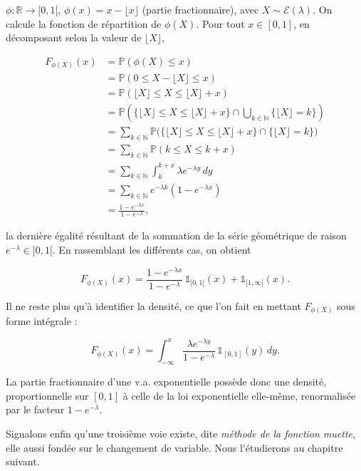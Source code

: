 \begin{exemple}
$\phi : \mathbb{R} \to [0, 1[$, $\phi(x) = x - \lfloor x \rfloor$ (partie fractionnaire), avec $X \sim \mathcal{E}(\lambda)$. On calcule la fonction de répartition de $\phi(X)$. Pour tout $x \in [0, 1]$, en décomposant selon la valeur de $\lfloor X \rfloor$,

\begin{align*}
F_{\phi(X)}(x) &= \mathbb{P}(\phi(X) \leq x) \\
&= \mathbb{P}(0 \leq X - \lfloor X \rfloor \leq x) \\
&= \mathbb{P}(\lfloor X \rfloor \leq X \leq \lfloor X \rfloor + x) \\
&= \mathbb{P}\left(\{\lfloor X \rfloor \leq X \leq \lfloor X \rfloor + x\} \cap \bigcup_{k \in \mathbb{N}} \{\lfloor X \rfloor = k\}\right) \\
&= \sum_{k \in \mathbb{N}} \mathbb{P}\big(\{\lfloor X \rfloor \leq X \leq \lfloor X \rfloor + x\} \cap \{\lfloor X \rfloor = k\}\big) \\
&= \sum_{k \in \mathbb{N}} \mathbb{P}(k \leq X \leq k + x) \\
&= \sum_{k \in \mathbb{N}} \int_k^{k+x} \lambda e^{-\lambda y}\, dy \\
&= \sum_{k \in \mathbb{N}} e^{-\lambda k}(1 - e^{-\lambda x}) \\
&= \frac{1 - e^{-\lambda x}}{1 - e^{-\lambda}},
\end{align*}

la dernière égalité résultant de la sommation de la série géométrique de raison $e^{-\lambda} \in {]0, 1[}$. En rassemblant les différents cas, on obtient

$$
F_{\phi(X)}(x) = \frac{1 - e^{-\lambda x}}{1 - e^{-\lambda}}\, \mathbb{1}_{[0,1[}(x) + \mathbb{1}_{[1,\infty[}(x).
$$

Il ne reste plus qu'à identifier la densité, ce que l'on fait en mettant $F_{\phi(X)}$ sous forme intégrale :

$$
F_{\phi(X)}(x) = \int_{-\infty}^x \frac{\lambda e^{-\lambda y}}{1 - e^{-\lambda}}\, \mathbb{1}_{[0,1]}(y)\, dy.
$$

La partie fractionnaire d'une v.a. exponentielle possède donc une densité, proportionnelle sur $[0, 1]$ à celle de la loi exponentielle elle-même, renormalisée par le facteur $1 - e^{-\lambda}$.

Signalons enfin qu'une troisième voie existe, dite \emph{méthode de la fonction muette}, elle aussi fondée sur le changement de variable. Nous l'étudierons au chapitre suivant.
\end{exemple}

